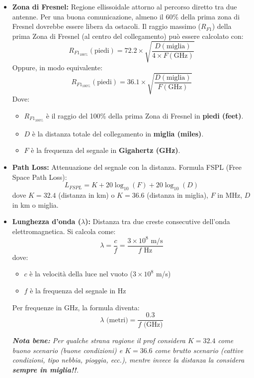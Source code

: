 \begin{itemize}
    \item \textbf{Zona di Fresnel:} Regione ellissoidale attorno al percorso diretto tra due antenne. Per una buona comunicazione, almeno il 60\% della prima zona di Fresnel dovrebbe essere libera da ostacoli. Il raggio massimo ($R_{F1}$) della prima Zona di Fresnel (al centro del collegamento) può essere calcolato con:
    \[ R_{F1_{\text{100\%}}} (\text{piedi}) = 72.2 \times \sqrt{\frac{D (\text{miglia})}{4 \times F (\text{GHz})}} \]
    Oppure, in modo equivalente:
    \[ R_{F1_{\text{100\%}}} (\text{piedi}) = 36.1 \times \sqrt{\frac{D (\text{miglia})}{F (\text{GHz})}} \]
    Dove:
    \begin{itemize}
        \item $R_{F1_{\text{100\%}}}$ è il raggio del 100\% della prima Zona di Fresnel in \textbf{piedi (feet)}.
        \item $D$ è la distanza totale del collegamento in \textbf{miglia (miles)}.
        \item $F$ è la frequenza del segnale in \textbf{Gigahertz (GHz)}.
    \end{itemize}
    \item \textbf{Path Loss:} Attenuazione del segnale con la distanza. Formula FSPL (Free Space Path Loss):
    \[ L_{FSPL} = K + 20\log_{10}(F) + 20\log_{10}(D) \]
    dove $K = 32.4$ (distanza in km) o $K = 36.6$ (distanza in miglia), $F$ in MHz, $D$ in km o miglia.

    \item \textbf{Lunghezza d'onda ($\lambda$):} Distanza tra due creste consecutive dell'onda elettromagnetica. Si calcola come:
    \[ \lambda = \frac{c}{f} = \frac{3 \times 10^8 \text{ m/s}}{f \text{ Hz}} \]
    dove:
    \begin{itemize}
        \item $c$ è la velocità della luce nel vuoto ($3 \times 10^8$ m/s)
        \item $f$ è la frequenza del segnale in Hz
    \end{itemize}
    Per frequenze in GHz, la formula diventa:
    \[ \lambda \text{ (metri)} = \frac{0.3}{f \text{ (GHz)}} \]

    \textit{\textbf{Nota bene:} Per qualche strana ragione il prof considera $K = 32.4$ come buono scenario (buone condizioni) e $K = 36.6$ come brutto scenario (cattive condizioni, tipo nebbia, pioggia, ecc.), mentre invece la distanza la considera \textbf{sempre in miglia!!}.}
\end{itemize}


